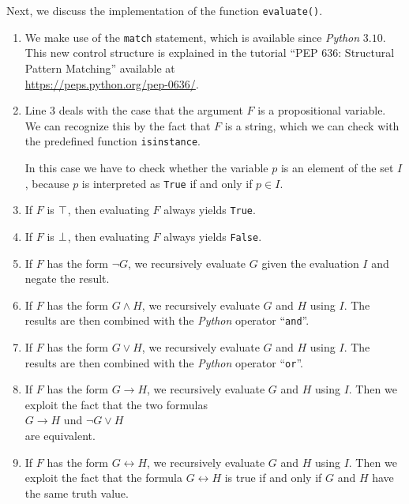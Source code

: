 \noindent
Next, we discuss the implementation of the function \texttt{evaluate()}.
\begin{enumerate}
\item We make use of the \texttt{match} statement, which is available since \textsl{Python} $3.10$.
      This new control structure is explained in the tutorial ``PEP 636: Structural Pattern Matching''
      available at
      \\[0.2cm]
      \hspace*{1.3cm}
      \href{https://peps.python.org/pep-0636/}{https://peps.python.org/pep-0636/}.
\item Line 3 deals with the case that the argument $F$ is a propositional variable.  We can recognize this by
      the fact that $F$ is a string, which we can check with the predefined function
      \texttt{isinstance}.

      In this case we have to check whether the variable $p$ is an element of the set $I$, because $p$ is
      interpreted as \texttt{True} if and only if $p \in I$.
\item If $F$ is $\top$, then evaluating $F$ always yields \texttt{True}.
\item If $F$ is $\bot$, then evaluating $F$ always yields \texttt{False}. 
\item If $F$ has the form $\neg G$, we recursively evaluate $G$ given the evaluation $I$ and negate the result.
\item If $F$ has the form $G \wedge H$, we recursively evaluate
      $G$ and $H$ using $I$.  The results are then combined with the \textsl{Python} operator
      ``\texttt{and}''.
\item If $F$ has the form $G \vee H$, we recursively evaluate
      $G$ and $H$ using $I$.  The results are then combined with the \textsl{Python} operator
      ``\texttt{or}''.
\item If $F$ has the form $G \rightarrow H$, we recursively evaluate
      $G$ and $H$ using $I$.  Then we exploit the fact that the two formulas    
      \\[0.2cm]
      \hspace*{1.3cm}
      $G \rightarrow H$ \quad und \quad $\neg G \vee H$
      \\[0.2cm]
      are equivalent.
\item If $F$ has the form $G \leftrightarrow H$, we recursively evaluate
      $G$ and $H$ using $I$.  Then we exploit the fact that the formula $G \leftrightarrow H$ is true if and
      only if $G$ and $H$ have the same truth value.
\end{enumerate}

